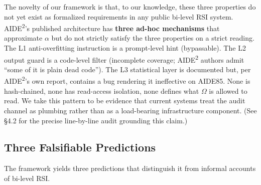 The novelty of our framework is that, to our knowledge, these three properties do not yet exist as formalized requirements in any public bi-level RSI system. AIDE\textsuperscript{2}'s published architecture has \textbf{three ad-hoc mechanisms} that approximate $\alpha$ but do not strictly satisfy the three properties on a strict reading. The L1 anti-overfitting instruction is a prompt-level hint (bypassable). The L2 output guard is a code-level filter (incomplete coverage; AIDE\textsuperscript{2} authors admit ``some of it is plain dead code''). The L3 statistical layer is documented but, per AIDE\textsuperscript{2}'s own report, contains a bug rendering it ineffective on AIDE85. None is hash-chained, none has read-access isolation, none defines what $\Omega$ is allowed to read. We take this pattern to be evidence that current systems treat the audit channel as plumbing rather than as a load-bearing infrastructure component. (See \S4.2 for the precise line-by-line audit grounding this claim.)

\subsection{Three Falsifiable Predictions}

The framework yields three predictions that distinguish it from informal accounts of bi-level RSI.

